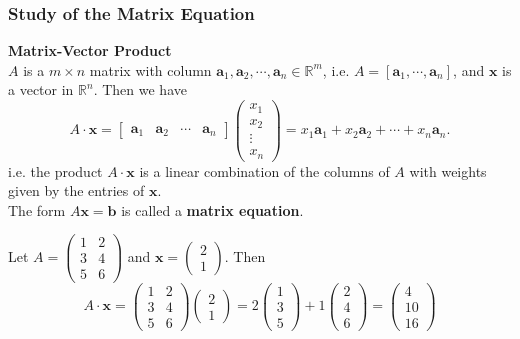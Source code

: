 \documentclass[10pt, a4paper]{article}
\begin{document}
\subsubsection*{Study of the Matrix Equation}
\begin{definition}
    \textbf{Matrix-Vector Product}\\
    $A$ is a $m\times n$ matrix with column $\mathbf{a}_1, \mathbf{a}_2, \cdots, \mathbf{a}_n \in \mathbb{R}^m$, i.e. $A=[\mathbf{a}_1, \cdots, \mathbf{a}_n]$, and $\mathbf{x}$ is a vector in $\mathbb{R}^n$. Then we have \[
        A\cdot \mathbf{x} = \begin{bmatrix}\mathbf{a}_1 & \mathbf{a}_2 & \cdots & \mathbf{a}_n\end{bmatrix} \begin{pmatrix} x_1 \\ x_2 \\ \vdots \\ x_n \end{pmatrix} = x_1 \mathbf{a}_1+x_2 \mathbf{a}_2+\cdots+x_n \mathbf{a}_n.
    \]
    i.e. the product $A\cdot \mathbf{x}$ is a linear combination of the columns of $A$ with weights given by the entries of $\mathbf{x}$.\\
    The form $A\mathbf{x} = \mathbf{b}$ is called a \textbf{matrix equation}.
\end{definition}
\begin{example}
    Let $A=\begin{pmatrix} 1 & 2 \\ 3 & 4 \\ 5 & 6 \end{pmatrix}$ and $\mathbf{x}=\begin{pmatrix} 2 \\ 1 \end{pmatrix}$. Then \[
        A\cdot \mathbf{x} = \begin{pmatrix} 1 & 2 \\ 3 & 4 \\ 5 & 6 \end{pmatrix} \begin{pmatrix} 2 \\ 1 \end{pmatrix} = 2\begin{pmatrix}
            1 \\ 3 \\ 5
        \end{pmatrix}
        +1\begin{pmatrix}
            2 \\ 4 \\ 6
        \end{pmatrix} = \begin{pmatrix}
            4 \\ 10 \\ 16
        \end{pmatrix}
    \]
\end{example}
\end{document}
